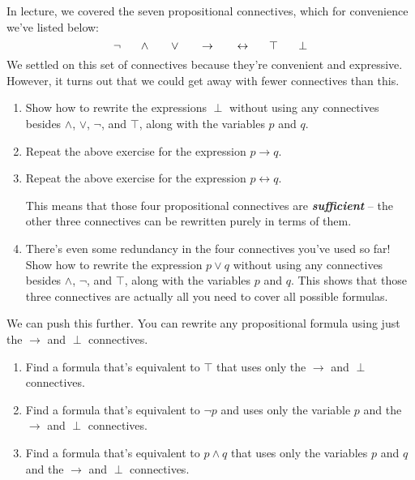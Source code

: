 \documentclass{article}
\renewcommand{\(}{\left(}
\renewcommand{\)}{\right)}
\theoremstyle{plain}
\theoremstyle{plain}
\theoremstyle{definition}
\renewcommand{\emph}[1]{\textit{\textbf{#1}}}
\begin{document}
In lecture, we covered the seven propositional connectives, which for convenience we've listed below:
$$
\neg \hphantom{--}
\land \hphantom{--} 
\lor \hphantom{--} 
\rightarrow \hphantom{--} 
\leftrightarrow \hphantom{--} 
\top \hphantom{--} 
\perp
$$
We settled on this set of connectives because they're convenient and expressive. However, it turns out that we could get away with fewer connectives than this.

\begin{enumerate}[label*=\roman*.,ref=\roman*]

    \item Show how to rewrite the expressions $\perp$ without using any connectives besides $\land$, $\lor$, $\neg$, and $\top$, along with the variables $p$ and $q$. 
    \item Repeat the above exercise for the expression $p \rightarrow q$.
    \item Repeat the above exercise for the expression $p \leftrightarrow q$.
    
    
    This means that those four propositional connectives are \emph{sufficient} -- the other three connectives can be rewritten purely in terms of them.
        
    \item There's even some redundancy in the four connectives you've used so far! Show how to rewrite the expression $p \lor q$ without using any connectives besides $\land$, $\neg$, and $\top$, along with the variables $p$ and $q$. This shows that those three connectives are actually all you need to cover all possible formulas.

\end{enumerate}

We can push this further. You can rewrite any propositional formula using just the $\rightarrow$ and $\perp$ connectives.

\begin{enumerate}[resume*]
    
    \item Find a formula that's equivalent to $\top$
    that uses only the $\rightarrow$ and $\perp$ connectives.
    
    
    \item Find a formula that's equivalent to $\neg p $ and uses only the variable $p$ and the $\rightarrow$ and $\perp$ connectives.
    
    
    \item Find a formula that's equivalent to $p \land q$
    that uses only the variables $p$ and $q$ and the $\rightarrow$
    and $\perp$ connectives.
    
\end{enumerate}
\end{document}

